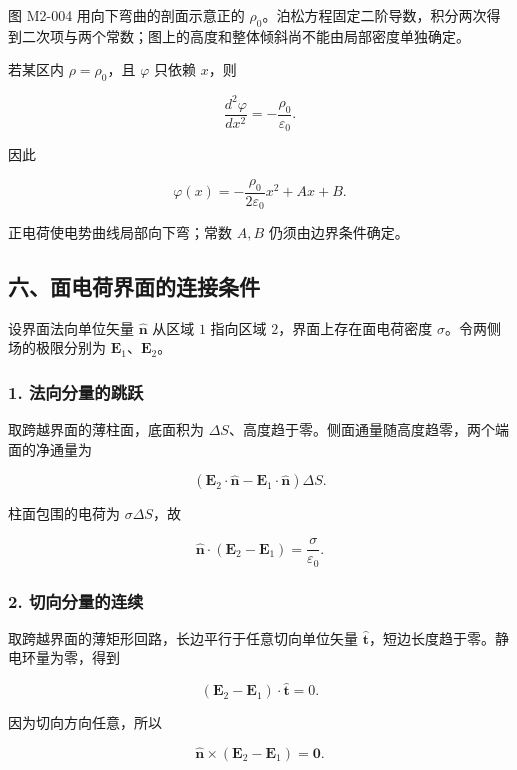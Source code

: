 图 M2-004 用向下弯曲的剖面示意正的
\(\rho_0\)。泊松方程固定二阶导数，积分两次得到二次项与两个常数；图上的高度和整体倾斜尚不能由局部密度单独确定。

若某区内 \(\rho=\rho_0\)，且 \(\varphi\) 只依赖 \(x\)，则

\[
\frac{d^2\varphi}{dx^2}
=
-\frac{\rho_0}{\varepsilon_0}.
\]

因此

\[
\varphi(x)
=
-\frac{\rho_0}{2\varepsilon_0}x^2+Ax+B.
\]

正电荷使电势曲线局部向下弯；常数 \(A,B\) 仍须由边界条件确定。

\subsection{六、面电荷界面的连接条件}\label{m2:ux516dux9762ux7535ux8377ux754cux9762ux7684ux8fdeux63a5ux6761ux4ef6}

设界面法向单位矢量 \(\hat{\mathbf n}\) 从区域 \(1\) 指向区域
\(2\)，界面上存在面电荷密度 \(\sigma\)。令两侧场的极限分别为
\(\mathbf E_1\)、\(\mathbf E_2\)。

\subsubsection{1.
法向分量的跳跃}\label{m2:ux6cd5ux5411ux5206ux91cfux7684ux8df3ux8dc3}

取跨越界面的薄柱面，底面积为
\(\Delta S\)、高度趋于零。侧面通量随高度趋零，两个端面的净通量为

\[
(\mathbf E_2\cdot\hat{\mathbf n}
-\mathbf E_1\cdot\hat{\mathbf n})\Delta S.
\]

柱面包围的电荷为 \(\sigma\Delta S\)，故

\[
\boxed{
\hat{\mathbf n}\cdot(\mathbf E_2-\mathbf E_1)
=
\frac{\sigma}{\varepsilon_0}
}.
\]

\subsubsection{2.
切向分量的连续}\label{m2:ux5207ux5411ux5206ux91cfux7684ux8fdeux7eed}

取跨越界面的薄矩形回路，长边平行于任意切向单位矢量
\(\hat{\mathbf t}\)，短边长度趋于零。静电环量为零，得到

\[
(\mathbf E_2-\mathbf E_1)\cdot\hat{\mathbf t}=0.
\]

因为切向方向任意，所以

\[
\boxed{
\hat{\mathbf n}\times(\mathbf E_2-\mathbf E_1)
=
\mathbf 0
}.
\]

